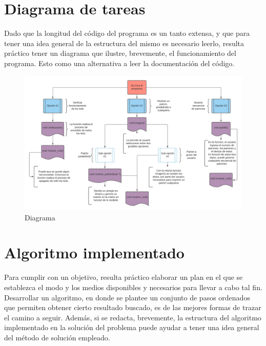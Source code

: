 \documentclass{article}
\begin{document}
\section{Diagrama de tareas}
Dado que la longitud del código del programa es un tanto extensa, y que para tener una idea general de la estructura del mismo es necesario leerlo, resulta práctico tener un diagrama que ilustre, brevemente, el funcionamiento del programa. Esto como una alternativa a leer la documentación del código.

\begin{figure}[h!]
\includegraphics[width=13cm]{Diagrama de tareas.jpeg}
\centering
\caption{Diagrama}
\label{fig:Diagrama}
\end{figure}

\section{Algoritmo implementado}
Para cumplir con un objetivo, resulta práctico elaborar un plan en el que se establezca el modo y los medios disponibles y necesarios para llevar a cabo tal fin. Desarrollar un algoritmo, en donde se plantee un conjunto de pasos ordenados que permiten obtener cierto resultado buscado, es de las mejores formas de trazar el camino a seguir. Además, si se redacta, brevemente, la estructura del algoritmo implementado en la solución del problema puede ayudar a tener una idea general del método de solución empleado. 
\end{document}
